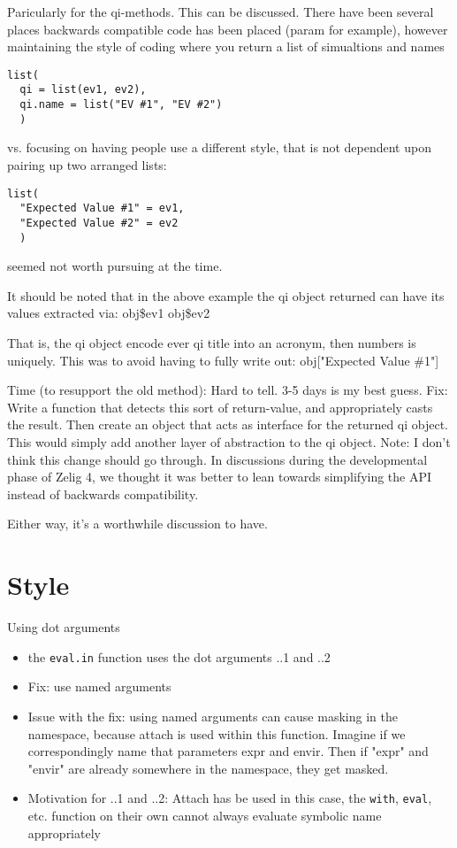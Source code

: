 \documentclass{article}
\begin{document}
Paricularly for the qi-methods. This can be discussed. There have been several places backwards compatible code has been placed (param for example), however maintaining the style of coding
where you return a list of simualtions and names
\begin{verbatim}
list(
  qi = list(ev1, ev2),
  qi.name = list("EV #1", "EV #2")
  )
\end{verbatim}

vs. focusing on having people use a different style, that is not dependent upon pairing up two arranged lists:

\begin{verbatim}
list(
  "Expected Value #1" = ev1,
  "Expected Value #2" = ev2
  )
\end{verbatim}

seemed not worth pursuing at the time.

It should be noted that in the above example the qi object returned can have its values extracted via:
obj\$ev1
obj\$ev2

That is, the qi object encode ever qi title into an acronym, then numbers is uniquely. This was to avoid having to fully write out:
obj["Expected Value \#1"]

Time (to resupport the old method): Hard to tell. 3-5 days is my best guess.
Fix: Write a function that detects this sort of return-value, and appropriately casts the result. Then create an object that acts as interface for the returned qi object. This would simply add another layer of abstraction to the qi object.
Note: I don't think this change should go through. In discussions during the developmental phase of Zelig 4, we thought it was better to lean towards simplifying the API instead of
backwards compatibility.

Either way, it's a worthwhile discussion to have.

\section{Style}

Using dot arguments \begin{itemize}
  \item the \texttt{eval.in} function uses the dot arguments ..1 and ..2
  \item Fix: use named arguments
  \item Issue with the fix: using named arguments can cause masking in the namespace, because attach is used within this function. Imagine if we correspondingly name that parameters
    expr and envir. Then if "expr" and "envir" are already somewhere in the namespace, they get masked.
  \item Motivation for ..1 and ..2: Attach has be used in this case, the \texttt{with}, \texttt{eval}, etc. function on their own cannot always evaluate symbolic name appropriately
\end{itemize}
\end{document}
